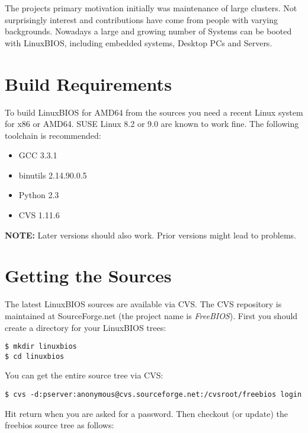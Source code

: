 \documentclass[titlepage,12pt]{article}
\begin{document}
The projects primary motivation initially was maintenance of large
clusters. Not surprisingly interest and contributions have come from
people with varying backgrounds.  Nowadays a large and growing number of
Systems can be booted with LinuxBIOS, including embedded systems,
Desktop PCs and Servers.

%
%

\section{Build Requirements}
To build LinuxBIOS for AMD64 from the sources you need a recent Linux
system for x86 or AMD64. SUSE Linux 8.2 or 9.0 are known to work fine.
The following toolchain is recommended:

 \begin{itemize}
 \item GCC 3.3.1
 \item binutils 2.14.90.0.5
 \item Python 2.3
 \item CVS 1.11.6
 \end{itemize}

\textbf{NOTE:} Later versions should also work. Prior versions might lead to problems.

\newpage

%
%

\section{Getting the Sources}

The latest LinuxBIOS sources are available via CVS. The CVS repository
is maintained at SourceForge.net (the project name is \emph{FreeBIOS}). 
First you should create a directory for your LinuxBIOS trees:

{ \small
\begin{verbatim}
$ mkdir linuxbios
$ cd linuxbios
\end{verbatim}
}

You can get the entire source tree via CVS:

{ \small 
\begin{verbatim}
$ cvs -d:pserver:anonymous@cvs.sourceforge.net:/cvsroot/freebios login
\end{verbatim}
}

Hit return when you are asked for a password. Then checkout (or update)
the freebios source tree as follows:
\end{document}
